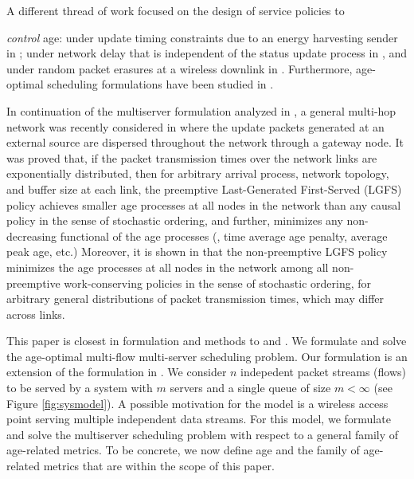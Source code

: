 A different thread of work focused on the design of service policies to {\emph{control} age: under update timing constraints due to an energy harvesting sender in \cite{BacinogCeranUysal_Biyikoglu2015, 2015ISITYates}; under network delay that is independent of the status update process in \cite{report_AgeOfInfo2016, 2015ISITYates}, and under random packet erasures at a wireless downlink in \cite{IgorAllerton2016}. Furthermore, age-optimal scheduling formulations have been studied in \cite{AtillaInfocom2015, EphremidesSchedulingICC2016, EphremidesSchedulingWiOpt2016, EytanSchedulingISIT2017}.

In continuation of the multiserver formulation analyzed in \cite{Bedewy2016}, a general multi-hop network was recently considered in \cite{Bedewy2017} where the update packets generated at an external source are dispersed throughout the network through a gateway node. It was proved that, if the packet transmission times over the network links are exponentially distributed, then for arbitrary arrival process, network topology, and buffer size at each link, the preemptive Last-Generated First-Served (LGFS) policy achieves smaller age processes at all nodes in the network than any causal policy in the sense of stochastic ordering, and further, minimizes any non-decreasing functional
of the age processes (\eg, time average age penalty, average peak age, etc.) Moreover, it is shown in \cite{Bedewy2017} that the non-preemptive LGFS policy minimizes the age processes at all nodes in the network among all non-preemptive work-conserving policies in the sense of stochastic ordering, for arbitrary general distributions of packet transmission times, which may differ across links.
 
This paper is closest in formulation and methods to \cite{Bedewy2016} and \cite{Bedewy2017}. We formulate and solve the age-optimal multi-flow multi-server scheduling problem. Our formulation is an extension of the formulation in \cite{bedewy}. We consider $n$ indepedent packet streams (flows) to be served by a system with $m$ servers and a single queue of size $m<\infty$ (see Figure \ref{fig:sysmodel}). A possible motivation for the model is a wireless access point serving multiple independent data streams. For this model, we formulate and solve the multiserver scheduling problem with respect to a general family of age-related metrics. To be concrete, we now define age and the family of age-related metrics that are within the scope of this paper.

}

